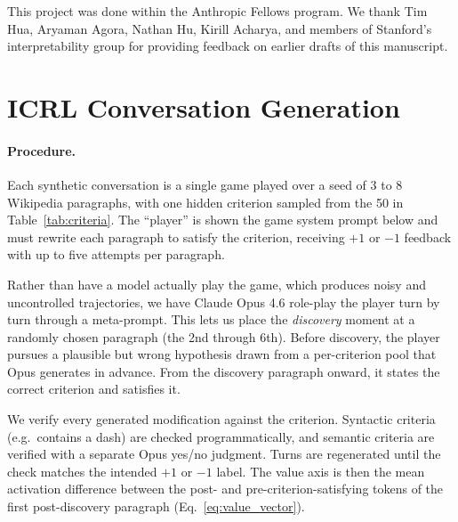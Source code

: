 \documentclass{article}
\begin{document}
\begin{ack}
This project was done within the Anthropic Fellows program. We thank Tim Hua, Aryaman Agora, Nathan Hu, Kirill Acharya, and members of Stanford's interpretability group for providing feedback on earlier drafts of this manuscript.
\end{ack}




\appendix

\section{ICRL Conversation Generation}
\label{app:icrl}

\paragraph{Procedure.}
Each synthetic conversation is a single game played over a seed of 3 to 8 Wikipedia paragraphs, with one hidden criterion sampled from the 50 in Table~\ref{tab:criteria}. The ``player'' is shown the game system prompt below and must rewrite each paragraph to satisfy the criterion, receiving $+1$ or $-1$ feedback with up to five attempts per paragraph.

Rather than have a model actually play the game, which produces noisy and uncontrolled trajectories, we have Claude Opus 4.6 role-play the player turn by turn through a meta-prompt. This lets us place the \emph{discovery} moment at a randomly chosen paragraph (the 2nd through 6th). Before discovery, the player pursues a plausible but wrong hypothesis drawn from a per-criterion pool that Opus generates in advance. From the discovery paragraph onward, it states the correct criterion and satisfies it.

We verify every generated modification against the criterion. Syntactic criteria (e.g.\ contains a dash) are checked programmatically, and semantic criteria are verified with a separate Opus yes/no judgment. Turns are regenerated until the check matches the intended $+1$ or $-1$ label. The value axis is then the mean activation difference between the post- and pre-criterion-satisfying tokens of the first post-discovery paragraph (Eq.~\ref{eq:value_vector}).
\end{document}
